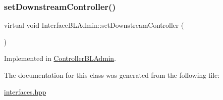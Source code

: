 \subsubsection{\texorpdfstring{set\+Downstream\+Controller()}{setDownstreamController()}}
{\footnotesize\ttfamily virtual void Interface\+B\+L\+Admin\+::set\+Downstream\+Controller (\begin{DoxyParamCaption}\item[{\hyperlink{class_stub_p_r}{Stub\+PR} $\ast$}]{ }\end{DoxyParamCaption})\hspace{0.3cm}{\ttfamily [pure virtual]}}



Implemented in \hyperlink{class_controller_b_l_admin_a372a88e17194ff8c2224f50b2862f35d}{Controller\+B\+L\+Admin}.



The documentation for this class was generated from the following file\+:\begin{DoxyCompactItemize}
\item 
\hyperlink{interfaces_8hpp}{interfaces.\+hpp}\end{DoxyCompactItemize}
